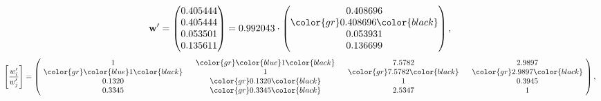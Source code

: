 \begin{example}
\begin{equation*}
\mathbf{w}^{\prime} =
\begin{pmatrix}
0.405444\\
0.405444\\
0.053501\\
0.135611
\end{pmatrix} =
0.992043\cdot
\begin{pmatrix}
0.408696\\
\color{gr} 0.408696\color{black} \\
0.053931\\
0.136699
\end{pmatrix},
\end{equation*}
\begin{equation*}
\left[ \frac{{w}^{\prime}_i}{{w}^{\prime}_j} \right] =
\begin{pmatrix}
$\,\,$ 1 $\,\,$ & $\,\,$\color{gr} \color{blue} 1\color{black} $\,\,$ & $\,\,$7.5782$\,\,$ & $\,\,$2.9897$\,\,$ \\
$\,\,$\color{gr} \color{blue} 1\color{black} $\,\,$ & $\,\,$ 1 $\,\,$ & $\,\,$\color{gr} 7.5782\color{black} $\,\,$ & $\,\,$\color{gr} 2.9897\color{black}   $\,\,$ \\
$\,\,$0.1320$\,\,$ & $\,\,$\color{gr} 0.1320\color{black} $\,\,$ & $\,\,$ 1 $\,\,$ & $\,\,$0.3945 $\,\,$ \\
$\,\,$0.3345$\,\,$ & $\,\,$\color{gr} 0.3345\color{black} $\,\,$ & $\,\,$2.5347$\,\,$ & $\,\,$ 1  $\,\,$ \\
\end{pmatrix},
\end{equation*}
\end{example}
\newpage
